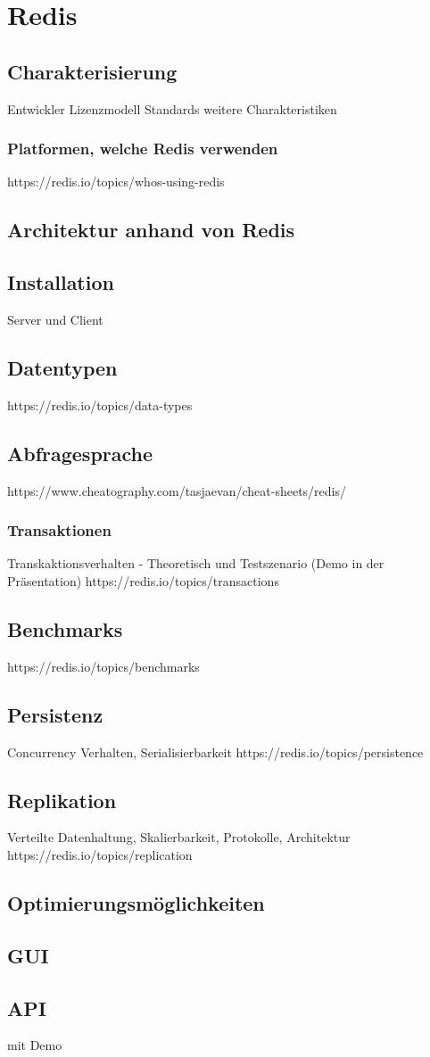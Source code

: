 \section{Redis}
\subsection{Charakterisierung}
Entwickler
Lizenzmodell
Standards
weitere Charakteristiken
\subsubsection{Platformen, welche Redis verwenden}
https://redis.io/topics/whos-using-redis
\subsection{Architektur anhand von Redis}
\subsection{Installation}
Server und Client
\subsection{Datentypen}
https://redis.io/topics/data-types
\subsection{Abfragesprache}
https://www.cheatography.com/tasjaevan/cheat-sheets/redis/
\subsubsection{Transaktionen}
Transkaktionsverhalten - Theoretisch und Testszenario (Demo in der Präsentation)
https://redis.io/topics/transactions
\subsection{Benchmarks}
https://redis.io/topics/benchmarks
\subsection{Persistenz}
Concurrency Verhalten, Serialisierbarkeit
https://redis.io/topics/persistence
\subsection{Replikation}
Verteilte Datenhaltung, Skalierbarkeit, Protokolle, Architektur
https://redis.io/topics/replication
\subsection{Optimierungsmöglichkeiten}
\subsection{GUI}
\subsection{API}
mit Demo
